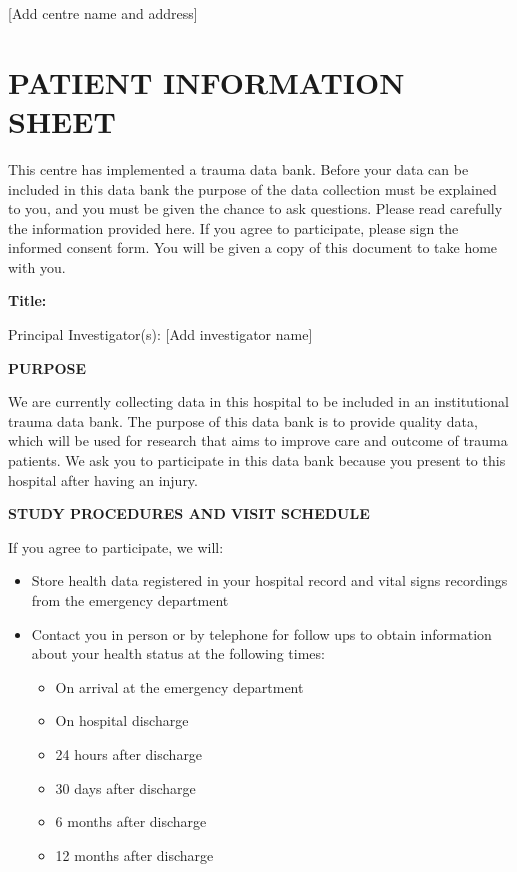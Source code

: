 {[}Add centre name and address{]}

\section{PATIENT INFORMATION SHEET}\label{patient-information-sheet}

This centre has implemented a trauma data bank. Before your data can be
included in this data bank the purpose of the data collection must be
explained to you, and you must be given the chance to ask questions.
Please read carefully the information provided here. If you agree to
participate, please sign the informed consent form. You will be given a
copy of this document to take home with you.

\textbf{Title:}

Principal Investigator(s): {[}Add investigator name{]}

\textbf{PURPOSE}

We are currently collecting data in this hospital to be included in an
institutional trauma data bank. The purpose of this data bank is to
provide quality data, which will be used for research that aims to
improve care and outcome of trauma patients. We ask you to participate
in this data bank because you present to this hospital after having an
injury.

\textbf{STUDY PROCEDURES AND VISIT SCHEDULE}

If you agree to participate, we will:

\begin{itemize}
\item
  Store health data registered in your hospital record and vital signs
  recordings from the emergency department
\item
  Contact you in person or by telephone for follow ups to obtain
  information about your health status at the following times:

  \begin{itemize}
  \itemsep1pt\parskip0pt
  \item
    On arrival at the emergency department
  \item
    On hospital discharge
  \item
    24 hours after discharge
  \item
    30 days after discharge
  \item
    6 months after discharge
  \item
    12 months after discharge
  \end{itemize}
\end{itemize}

